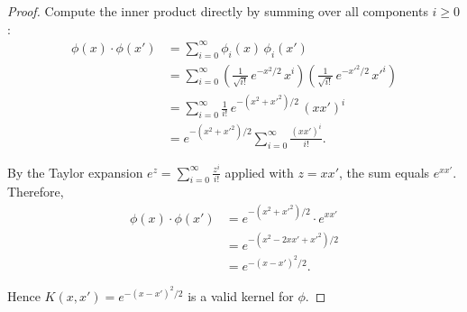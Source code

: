 \documentclass{article}
\begin{document}
\begin{proof}
Compute the inner product directly by summing over all components $i \ge 0$:
\begin{align*}
  \phi(x)\cdot\phi(x')
  &= \sum_{i=0}^{\infty} \phi_i(x)\,\phi_i(x') \\
  &= \sum_{i=0}^{\infty}
       \left(\frac{1}{\sqrt{i!}}\,e^{-x^2/2}\,x^i\right)
       \left(\frac{1}{\sqrt{i!}}\,e^{-x'^2/2}\,x'^i\right) \\
  &= \sum_{i=0}^{\infty} \frac{1}{i!}\,e^{-(x^2+x'^2)/2}\,(xx')^i \\
  &= e^{-(x^2+x'^2)/2} \sum_{i=0}^{\infty} \frac{(xx')^i}{i!}.
\end{align*}

By the Taylor expansion $e^z = \displaystyle\sum_{i=0}^{\infty}\frac{z^i}{i!}$
applied with $z = xx'$, the sum equals $e^{xx'}$.  Therefore,
\begin{align*}
  \phi(x)\cdot\phi(x')
  &= e^{-(x^2+x'^2)/2}\cdot e^{xx'} \\
  &= e^{-(x^2 - 2xx' + x'^2)/2} \\
  &= e^{-(x-x')^2/2}.
\end{align*}

Hence $K(x,x') = e^{-(x-x')^2/2}$ is a valid kernel for $\phi$.
\end{proof}
\end{document}
